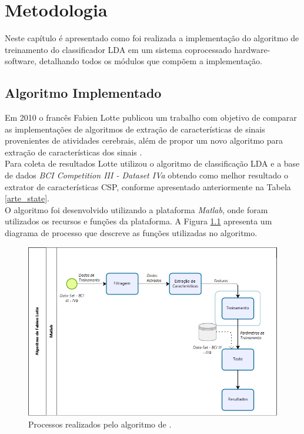 \chapter[Metodologia]{Metodologia}
Neste capítulo é apresentado como foi realizada a implementação do algoritmo de treinamento do classificador LDA em um sistema coprocessado hardware-software, detalhando todos os módulos que compõem a implementação.

\section{Algoritmo Implementado}
Em 2010 o francês Fabien Lotte publicou um trabalho com objetivo de comparar as implementações de algoritmos de extração de características de sinais provenientes de atividades cerebrais, além de propor um novo algoritmo para extração de características dos sinais \cite{F.Lotte}.\\
Para coleta de resultados Lotte utilizou o algoritmo de classificação LDA e a base de dados \textit{BCI Competition III - Dataset IVa} obtendo como melhor resultado o extrator de características CSP, conforme apresentado anteriormente na Tabela \ref{arte_state}.\\
O algoritmo foi desenvolvido utilizando a plataforma \textit{Matlab}, onde foram utilizados os recursos e funções da plataforma. A Figura \ref{processos_alg} apresenta um diagrama de processo que descreve as funções utilizadas no algoritmo.

\begin{figure}[h]
	\centering
	\includegraphics[keepaspectratio=true,scale=0.6]{figuras/Processos_Algoritmo_Lotte.PNG}
	\caption{Processos realizados pelo algoritmo de \cite{F.Lotte}.}
	\label{processos_alg}
\end{figure}

